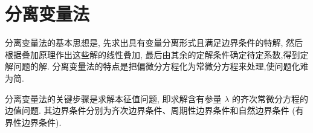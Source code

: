 \chapter{分离变量法}


分离变量法的基本思想是, 
先求出具有变量分离形式且满足边界条件的特解,
然后根据叠加原理作出这些解的线性叠加, 
最后由其余的定解条件确定待定系数,得到定解问题的解.
分离变量法的特点是把偏微分方程化为常微分方程来处理,使问题化难为简.

分离变量法的关键步骤是求解本征值问题, 
即求解含有参量 $\lambda$ 的齐次常微分方程的边值问题. 
其边界条件分别为齐次边界条件、周期性边界条件和自然边界条件
(有界性边界条件).




% 
% 
% 


% 
% 